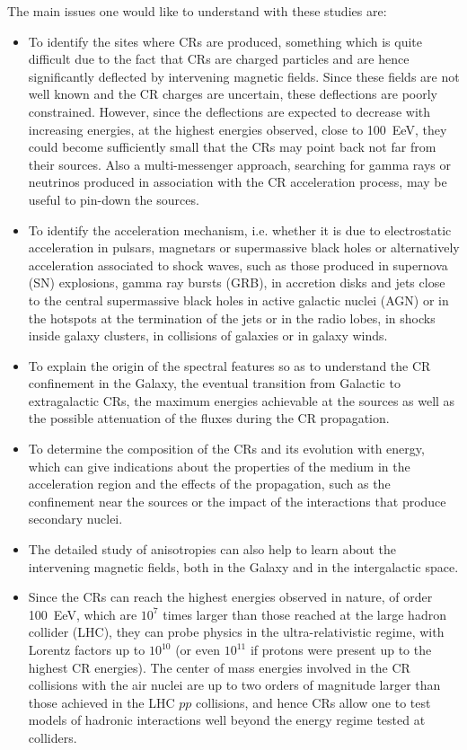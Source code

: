 \documentclass[twoside,12pt]{article}
\begin{document}
The main issues one would like to understand with these studies are:
\begin{itemize}
\item To identify the sites where CRs are produced, something which is quite difficult due to the fact that CRs are charged particles and are hence significantly deflected by intervening magnetic fields. Since these fields are not well known and the CR charges are uncertain, these deflections are poorly constrained. However, since the deflections are expected to decrease with increasing energies, at the highest energies observed, close to 100~EeV, they could become sufficiently small  that the CRs may point back not far from their sources. Also a multi-messenger approach, searching for gamma rays or neutrinos produced in association with the CR acceleration process, may be useful to pin-down the sources.

\item To identify the acceleration mechanism, i.e. whether it is due to electrostatic acceleration in pulsars, magnetars or supermassive black holes or  alternatively acceleration associated to shock waves, such as those produced in supernova (SN) explosions, gamma ray bursts (GRB), in accretion disks and jets close to the central supermassive black holes in active galactic nuclei (AGN) or in the hotspots at the termination of the jets or in the radio lobes,  in shocks inside galaxy clusters, in collisions of galaxies or in galaxy winds.

\item To explain the origin of the spectral features so as to understand the CR confinement in the Galaxy, the eventual transition from Galactic to extragalactic CRs, the maximum energies achievable at the sources as well as the possible attenuation of the fluxes during the CR propagation.

\item To determine the composition of the CRs and its evolution with energy, which can give indications about the properties of the medium in the acceleration region and the effects of the propagation, such as the confinement near the sources or the impact of the interactions that produce secondary nuclei.

\item The detailed study of anisotropies can also help to learn about the intervening magnetic fields, both in the Galaxy and in the intergalactic space.

\item Since the CRs can reach the highest energies observed in nature, of order 100~EeV, which are $10^7$ times larger than those reached at the large hadron collider (LHC), they  can probe physics in the ultra-relativistic regime, with Lorentz factors up to $10^{10}$ (or even $10^{11}$ if protons were present up to the highest CR energies). The center of mass energies involved in the CR collisions with the air nuclei are up to two orders of magnitude larger than those achieved in the LHC $pp$ collisions, and hence CRs allow one to test models of hadronic interactions well beyond the energy regime tested at colliders.
  
  \end{itemize}
\end{document}
